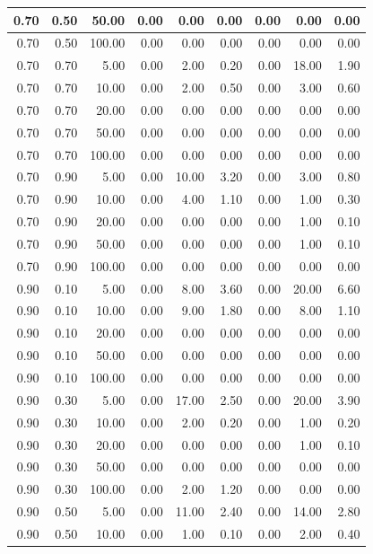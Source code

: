 \documentclass{bmstu}
\begin{document}
\begin{longtable}{|r|r|r|r|r|r|r|r|r|}
0.70 & 0.50 & 50.00 & 0.00 & 0.00 & 0.00 & 0.00 & 0.00 & 0.00 \\ \hline
0.70 & 0.50 & 100.00 & 0.00 & 0.00 & 0.00 & 0.00 & 0.00 & 0.00 \\ \hline
0.70 & 0.70 & 5.00 & 0.00 & 2.00 & 0.20 & 0.00 & 18.00 & 1.90 \\ \hline
0.70 & 0.70 & 10.00 & 0.00 & 2.00 & 0.50 & 0.00 & 3.00 & 0.60 \\ \hline
0.70 & 0.70 & 20.00 & 0.00 & 0.00 & 0.00 & 0.00 & 0.00 & 0.00 \\ \hline
0.70 & 0.70 & 50.00 & 0.00 & 0.00 & 0.00 & 0.00 & 0.00 & 0.00 \\ \hline
0.70 & 0.70 & 100.00 & 0.00 & 0.00 & 0.00 & 0.00 & 0.00 & 0.00 \\ \hline
0.70 & 0.90 & 5.00 & 0.00 & 10.00 & 3.20 & 0.00 & 3.00 & 0.80 \\ \hline
0.70 & 0.90 & 10.00 & 0.00 & 4.00 & 1.10 & 0.00 & 1.00 & 0.30 \\ \hline
0.70 & 0.90 & 20.00 & 0.00 & 0.00 & 0.00 & 0.00 & 1.00 & 0.10 \\ \hline
0.70 & 0.90 & 50.00 & 0.00 & 0.00 & 0.00 & 0.00 & 1.00 & 0.10 \\ \hline
0.70 & 0.90 & 100.00 & 0.00 & 0.00 & 0.00 & 0.00 & 0.00 & 0.00 \\ \hline
0.90 & 0.10 & 5.00 & 0.00 & 8.00 & 3.60 & 0.00 & 20.00 & 6.60 \\ \hline
0.90 & 0.10 & 10.00 & 0.00 & 9.00 & 1.80 & 0.00 & 8.00 & 1.10 \\ \hline
0.90 & 0.10 & 20.00 & 0.00 & 0.00 & 0.00 & 0.00 & 0.00 & 0.00 \\ \hline
0.90 & 0.10 & 50.00 & 0.00 & 0.00 & 0.00 & 0.00 & 0.00 & 0.00 \\ \hline
0.90 & 0.10 & 100.00 & 0.00 & 0.00 & 0.00 & 0.00 & 0.00 & 0.00 \\ \hline
0.90 & 0.30 & 5.00 & 0.00 & 17.00 & 2.50 & 0.00 & 20.00 & 3.90 \\ \hline
0.90 & 0.30 & 10.00 & 0.00 & 2.00 & 0.20 & 0.00 & 1.00 & 0.20 \\ \hline
0.90 & 0.30 & 20.00 & 0.00 & 0.00 & 0.00 & 0.00 & 1.00 & 0.10 \\ \hline
0.90 & 0.30 & 50.00 & 0.00 & 0.00 & 0.00 & 0.00 & 0.00 & 0.00 \\ \hline
0.90 & 0.30 & 100.00 & 0.00 & 2.00 & 1.20 & 0.00 & 0.00 & 0.00 \\ \hline
0.90 & 0.50 & 5.00 & 0.00 & 11.00 & 2.40 & 0.00 & 14.00 & 2.80 \\ \hline
0.90 & 0.50 & 10.00 & 0.00 & 1.00 & 0.10 & 0.00 & 2.00 & 0.40 \\ \hline

\end{longtable}
\end{document}
